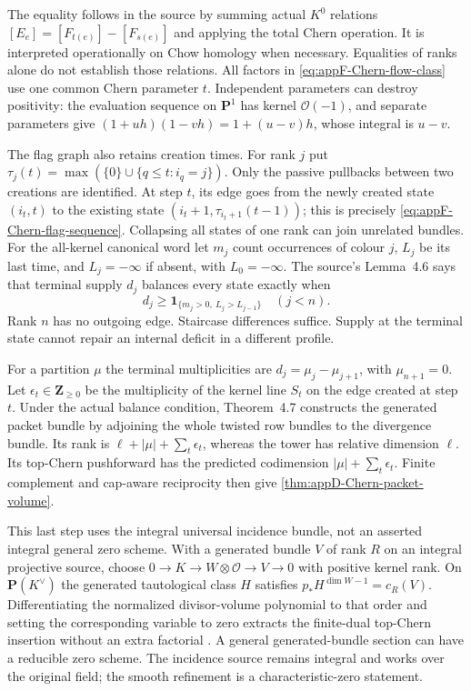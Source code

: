 The equality follows in the source by summing actual $K^0$ relations
$[E_e]=[F_{t(e)}]-[F_{s(e)}]$ and applying the total Chern operation.
It is interpreted operationally on Chow homology when necessary.
Equalities of ranks alone do not establish those relations.
All factors in \eqref{eq:appF-Chern-flow-class} use one common
Chern parameter $t$. Independent parameters can destroy positivity:
the evaluation sequence on $\mathbf P^1$ has kernel $\mathcal O(-1)$,
and separate parameters give
$(1+uh)(1-vh)=1+(u-v)h$, whose integral is $u-v$.

The flag graph also retains creation times. For rank $j$ put
$\tau_j(t)=\max(\{0\}\cup\{q\leq t:i_q=j\})$.
Only the passive pullbacks between two creations are identified.
At step $t$, its edge goes from the newly created state
$(i_t,t)$ to the existing state
$(i_t+1,\tau_{i_t+1}(t-1))$; this is precisely
\eqref{eq:appF-Chern-flag-sequence}. Collapsing all states of
one rank can join unrelated bundles.
For the all-kernel canonical word let $m_j$ count occurrences of
colour $j$, $L_j$ be its last time, and $L_j=-\infty$ if absent,
with $L_0=-\infty$. The source's Lemma~4.6 says that terminal
supply $d_j$ balances every state exactly when
\[
 d_j\geq\mathbf1_{\{m_j>0,\ L_j>L_{j-1}\}}\quad(j<n).
\tag{F.34}\label{eq:appF-Chern-terminal-balance}
\]
Rank $n$ has no outgoing edge. Staircase differences suffice.
Supply at the terminal state cannot repair an internal deficit
in a different profile.

For a partition $\mu$ the terminal multiplicities are
$d_j=\mu_j-\mu_{j+1}$, with $\mu_{n+1}=0$.
Let $\epsilon_t\in\mathbf Z_{\geq0}$ be the multiplicity of the
kernel line $S_t$ on the edge created at step $t$.
Under the actual balance condition, Theorem~4.7 constructs the
generated packet bundle by adjoining the whole twisted row bundles
to the divergence bundle. Its rank is
$\ell+|\mu|+\sum_t\epsilon_t$, whereas the tower has relative
dimension $\ell$. Its top-Chern pushforward has the predicted
codimension $|\mu|+\sum_t\epsilon_t$.
Finite complement and cap-aware reciprocity then give
\cref{thm:appD-Chern-packet-volume}.

This last step uses the integral universal incidence bundle,
not an asserted integral general zero scheme. With a generated
bundle $V$ of rank $R$ on an integral projective source, choose
$0\to K\to W\otimes\mathcal O\to V\to0$ with positive kernel
rank. On $\mathbf P(K^\vee)$ the generated tautological class $H$
satisfies $p_*H^{\dim W-1}=c_R(V)$.
Differentiating the normalized divisor-volume polynomial to that
order and setting the corresponding variable to zero extracts
the finite-dual top-Chern insertion without an extra factorial
\cite[Proposition~2.8]{NguyenDangWang26ChernFlowV4}.
A general generated-bundle section can have a reducible zero scheme.
The incidence source remains integral and works over the original
field; the smooth refinement is a characteristic-zero statement.

